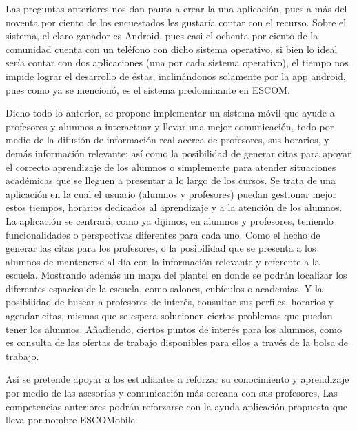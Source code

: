 \noindent
\newline
Las preguntas anteriores nos dan pauta a crear la una aplicación, pues a más del noventa por ciento de los
encuestados les gustaría contar con el recurso. Sobre el sistema, el claro ganador es Android, pues casi
el ochenta por ciento de la comunidad cuenta con un teléfono con dicho sistema operativo, si bien lo ideal
sería contar con dos aplicaciones (una por cada sistema operativo), el tiempo nos impide lograr el
desarrollo de éstas, inclinándonos solamente por la app android, pues como ya se mencionó, es el sistema
predominante en ESCOM.

\noindent
\newline
Dicho todo lo anterior, se propone implementar un sistema móvil que ayude a profesores y alumnos a interactuar 
y llevar una mejor comunicación, todo por medio de la difusión de información real acerca de profesores, 
sus horarios, y demás información relevante; así como la posibilidad de generar citas para apoyar el correcto 
aprendizaje de los alumnos o simplemente para atender situaciones académicas que se lleguen a presentar a lo 
largo de los cursos.
Se trata de una aplicación en la cual el usuario (alumnos y profesores) puedan gestionar mejor estos 
tiempos, horarios dedicados al aprendizaje y a la atención de los alumnos. La aplicación se centrará, como 
ya dijimos, en alumnos y profesores, teniendo funcionalidades o perspectivas diferentes para cada uno. Como 
el hecho de generar las citas para los profesores, o la posibilidad que se presenta a los alumnos de 
mantenerse al día con la información relevante y referente a la escuela. Mostrando además un mapa del plantel 
en donde se podrán localizar los diferentes espacios de la escuela, como salones, cubículos o academias. 
Y la posibilidad de buscar a profesores de interés, consultar sus perfiles, horarios y agendar citas, 
mismas que se espera solucionen ciertos problemas que puedan tener los alumnos. Añadiendo, ciertos
puntos de interés para los alumnos, como es consulta de las ofertas de trabajo disponibles para ellos a
través de la bolsa de trabajo. 

\noindent
Así se pretende apoyar a los estudiantes a reforzar su conocimiento y aprendizaje por medio de 
las asesorías y comunicación más cercana con sus profesores, Las competencias anteriores podrán reforzarse
con la ayuda aplicación propuesta que lleva por nombre ESCOMobile.
